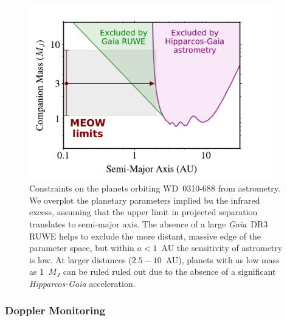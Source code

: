 \documentclass[twocolumn]{aastex631}
\begin{document}
\begin{figure}
  \begin{center}
    \vspace{-2mm}
      \leavevmode
        \begin{minipage}[c]{0.53\textwidth}
\includegraphics[width=0.95\textwidth]{Figures/astrometry.pdf}
  \end{minipage}\hfill
  \begin{minipage}[c]{0.47\textwidth}
\caption{Constraints on the planets orbiting WD~0310-688 from astrometry. We overplot the planetary parameters implied bu the infrared excess, assuming that the upper limit in projected separation translates to semi-major axis. The absence of a large \textit{Gaia}~DR3 RUWE helps to exclude the more distant, massive edge of the parameter space, but within $a<1$~AU the sensitivity of astrometry is low. At larger distances ($2.5-10$~AU), planets with as low mass as 1~$M_J$ can be ruled ruled out due to the absence of a significant \textit{Hipparcos-Gaia} acceleration.
} \label{astrometry}
\end{minipage}
\end{center}
\end{figure}
 


\subsubsection{Doppler Monitoring}
\end{document}
